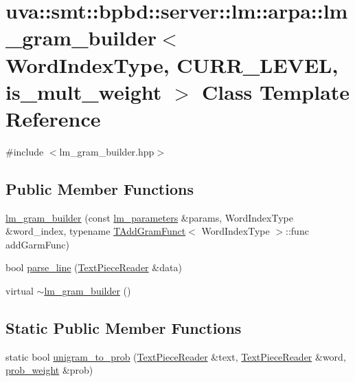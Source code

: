 \hypertarget{classuva_1_1smt_1_1bpbd_1_1server_1_1lm_1_1arpa_1_1lm__gram__builder}{}\section{uva\+:\+:smt\+:\+:bpbd\+:\+:server\+:\+:lm\+:\+:arpa\+:\+:lm\+\_\+gram\+\_\+builder$<$ Word\+Index\+Type, C\+U\+R\+R\+\_\+\+L\+E\+V\+E\+L, is\+\_\+mult\+\_\+weight $>$ Class Template Reference}
\label{classuva_1_1smt_1_1bpbd_1_1server_1_1lm_1_1arpa_1_1lm__gram__builder}


{\ttfamily \#include $<$lm\+\_\+gram\+\_\+builder.\+hpp$>$}

\subsection*{Public Member Functions}
\begin{DoxyCompactItemize}
\item 
\hyperlink{classuva_1_1smt_1_1bpbd_1_1server_1_1lm_1_1arpa_1_1lm__gram__builder_aa5dc99da59bfc3886691c8a6257795d5}{lm\+\_\+gram\+\_\+builder} (const \hyperlink{structuva_1_1smt_1_1bpbd_1_1server_1_1lm_1_1lm__parameters}{lm\+\_\+parameters} \&params, Word\+Index\+Type \&word\+\_\+index, typename \hyperlink{structuva_1_1smt_1_1bpbd_1_1server_1_1lm_1_1arpa_1_1_t_add_gram_funct}{T\+Add\+Gram\+Funct}$<$ Word\+Index\+Type $>$\+::func add\+Garm\+Func)
\item 
bool \hyperlink{classuva_1_1smt_1_1bpbd_1_1server_1_1lm_1_1arpa_1_1lm__gram__builder_aa3bb6809771ddc403c6b7a08d08ae7c1}{parse\+\_\+line} (\hyperlink{classuva_1_1utils_1_1file_1_1_text_piece_reader}{Text\+Piece\+Reader} \&data)
\item 
virtual \hyperlink{classuva_1_1smt_1_1bpbd_1_1server_1_1lm_1_1arpa_1_1lm__gram__builder_a3764e9353b665dc29858c5d6818bc1e1}{$\sim$lm\+\_\+gram\+\_\+builder} ()
\end{DoxyCompactItemize}
\subsection*{Static Public Member Functions}
\begin{DoxyCompactItemize}
\item 
static bool \hyperlink{classuva_1_1smt_1_1bpbd_1_1server_1_1lm_1_1arpa_1_1lm__gram__builder_a8383fcbf5ddcc76ef77c61136566d26c}{unigram\+\_\+to\+\_\+prob} (\hyperlink{classuva_1_1utils_1_1file_1_1_text_piece_reader}{Text\+Piece\+Reader} \&text, \hyperlink{classuva_1_1utils_1_1file_1_1_text_piece_reader}{Text\+Piece\+Reader} \&word, \hyperlink{namespaceuva_1_1smt_1_1bpbd_1_1server_a01e9ea4de9c226f4464862e84ff0bbcc}{prob\+\_\+weight} \&prob)
\end{DoxyCompactItemize}
